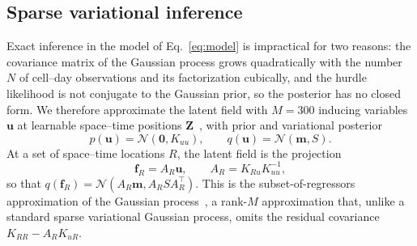 \subsection{Sparse variational inference}
\label{sec:variational}

Exact inference in the model of Eq.~\eqref{eq:model} is impractical for two reasons: the covariance matrix of the Gaussian process grows quadratically with the number $N$ of cell--day observations and its factorization cubically, and the hurdle likelihood is not conjugate to the Gaussian prior, so the posterior has no closed form.
We therefore approximate the latent field with $M=300$ inducing variables $\mathbf{u}$ at learnable space--time positions $\mathbf{Z}$~\citep{titsias2009variational,hensman2015scalable}, with prior and variational posterior
\begin{equation}
    p(\mathbf{u})=\mathcal{N}(\mathbf{0},K_{uu}),
    \qquad
    q(\mathbf{u})=\mathcal{N}(\mathbf{m},S).
\end{equation}
At a set of space--time locations $R$, the latent field is the projection
\begin{equation}
    \mathbf{f}_R=A_R\mathbf{u},
    \qquad
    A_R=K_{Ru}K_{uu}^{-1},
\end{equation}
so that $q(\mathbf{f}_R)=\mathcal{N}(A_R\mathbf{m},A_RSA_R^\top)$. This is the subset-of-regressors approximation of the Gaussian process~\citep{quinonero2005unifying}, a rank-$M$ approximation that, unlike a standard sparse variational Gaussian process, omits the residual covariance $K_{RR}-A_RK_{uR}$.


